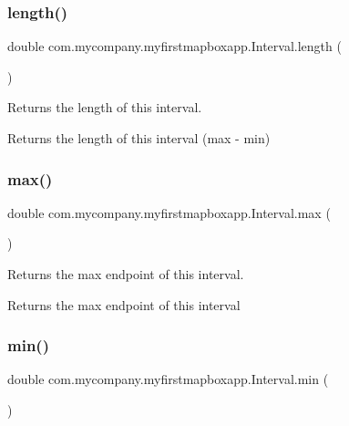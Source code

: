 \subsubsection{\texorpdfstring{length()}{length()}}
{\footnotesize\ttfamily double com.\+mycompany.\+myfirstmapboxapp.\+Interval.\+length (\begin{DoxyParamCaption}{ }\end{DoxyParamCaption})\hspace{0.3cm}{\ttfamily [inline]}}

Returns the length of this interval.

\begin{DoxyReturn}{Returns}
the length of this interval (max -\/ min) 
\end{DoxyReturn}
\mbox{\label{classcom_1_1mycompany_1_1myfirstmapboxapp_1_1_interval_a8f959bd89864640b4febcbfebe376f31}} 
\subsubsection{\texorpdfstring{max()}{max()}}
{\footnotesize\ttfamily double com.\+mycompany.\+myfirstmapboxapp.\+Interval.\+max (\begin{DoxyParamCaption}{ }\end{DoxyParamCaption})\hspace{0.3cm}{\ttfamily [inline]}}

Returns the max endpoint of this interval.

\begin{DoxyReturn}{Returns}
the max endpoint of this interval 
\end{DoxyReturn}
\mbox{\label{classcom_1_1mycompany_1_1myfirstmapboxapp_1_1_interval_ad537811e98caba58c27071acced4c252}} 
\subsubsection{\texorpdfstring{min()}{min()}}
{\footnotesize\ttfamily double com.\+mycompany.\+myfirstmapboxapp.\+Interval.\+min (\begin{DoxyParamCaption}{ }\end{DoxyParamCaption})\hspace{0.3cm}{\ttfamily [inline]}}

